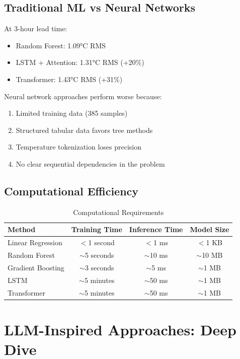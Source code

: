\documentclass[11pt,letterpaper]{article}
\begin{document}
\subsection{Traditional ML vs Neural Networks}

At 3-hour lead time:
\begin{itemize}
    \item Random Forest: 1.09°C RMS
    \item LSTM + Attention: 1.31°C RMS (+20\%)
    \item Transformer: 1.43°C RMS (+31\%)
\end{itemize}

Neural network approaches perform worse because:
\begin{enumerate}
    \item Limited training data (385 samples)
    \item Structured tabular data favors tree methods
    \item Temperature tokenization loses precision
    \item No clear sequential dependencies in the problem
\end{enumerate}

\subsection{Computational Efficiency}

\begin{table}[H]
\centering
\caption{Computational Requirements}
\label{tab:compute}
\begin{tabular}{l|ccc}
\toprule
\textbf{Method} & \textbf{Training Time} & \textbf{Inference Time} & \textbf{Model Size} \\
\midrule
Linear Regression & $<$1 second & $<$1 ms & $<$1 KB \\
Random Forest & $\sim$5 seconds & $\sim$10 ms & $\sim$10 MB \\
Gradient Boosting & $\sim$3 seconds & $\sim$5 ms & $\sim$1 MB \\
LSTM & $\sim$5 minutes & $\sim$50 ms & $\sim$1 MB \\
Transformer & $\sim$5 minutes & $\sim$50 ms & $\sim$1 MB \\
\bottomrule
\end{tabular}
\end{table}

\section{LLM-Inspired Approaches: Deep Dive}
\end{document}
